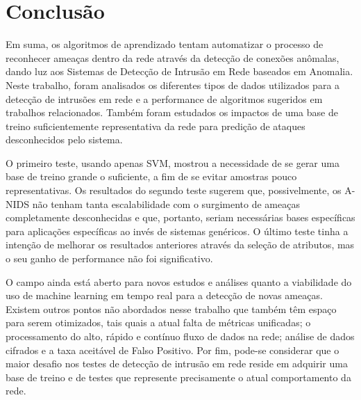 \chapter{Conclusão}
\label{ch:conclusao}

Em suma, os algoritmos de aprendizado tentam automatizar o processo de reconhecer ameaças dentro da rede
através da detecção de conexões anômalas, dando luz aos Sistemas de Detecção de Intrusão em Rede baseados em Anomalia.
Neste trabalho, foram analisados os diferentes tipos de dados utilizados para a detecção de intrusões em rede e a
performance de algoritmos sugeridos em trabalhos relacionados. Também foram estudados os impactos de uma base de
treino suficientemente representativa da rede para predição de ataques desconhecidos pelo sistema.
\par O primeiro teste, usando apenas SVM, mostrou a necessidade de se gerar uma base de treino grande o suficiente, a
fim de se evitar amostras pouco representativas. Os resultados do segundo teste sugerem que, possivelmente, os A-NIDS
não tenham tanta escalabilidade com o surgimento de ameaças completamente desconhecidas e que, portanto, seriam
necessárias bases específicas para aplicações específicas ao invés de sistemas genéricos. O último teste tinha a
intenção de melhorar os resultados anteriores através da seleção de atributos, mas o seu ganho de performance não foi
significativo.
\par O campo ainda está aberto para novos estudos e análises quanto a viabilidade do uso de machine learning em tempo
real para a detecção de novas ameaças. Existem outros pontos não abordados nesse trabalho que também têm espaço para
serem otimizados, tais quais a atual falta de métricas unificadas; o processamento do alto, rápido e contínuo fluxo de
dados na rede; análise de dados cifrados e a taxa aceitável de Falso Positivo. Por fim, pode-se considerar que
 o maior desafio nos testes de detecção de intrusão em rede reside em adquirir uma base de treino e de testes que
 represente precisamente o atual comportamento da rede.